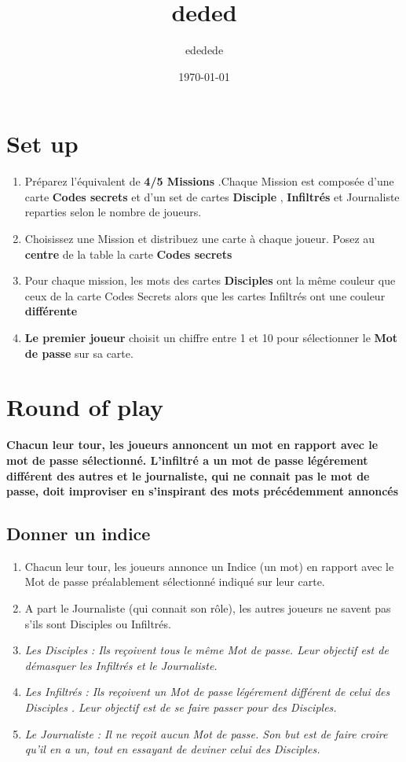 \documentclass{article}%
\title{deded}%
\author{ededede}%
\date{\today}%
\begin{document}
%
\pagestyle{empty}%
\normalsize%
\maketitle%
\section{ Set up
}%
\label{sec:Setup}%
\begin{enumerate}%
\item%
%
 Préparez l'équivalent de %
\textbf{4/5 Missions}%
.Chaque Mission est composée d'une carte %
\textbf{Codes secrets}%
 et d'un set de cartes %
\textbf{Disciple}%
,%
\textbf{ Infiltrés}%
 et Journaliste reparties selon le nombre de joueurs.
%
\item%
%
 Choisissez une Mission et distribuez une carte à chaque joueur. Posez au %
\textbf{centre}%
 de la table la carte %
\textbf{Codes secrets}%
\item%
%
 Pour chaque mission, les mots des cartes %
\textbf{Disciples}%
 ont la même couleur que ceux de la carte Codes Secrets alors que les cartes Infiltrés ont une couleur %
\textbf{différente}%
\item%
%
\textbf{Le premier joueur}%
 choisit un chiffre entre 1 et 10 pour sélectionner le %
\textbf{Mot de passe}%
 sur sa carte.
%
\end{enumerate}

%
\section{ Round of play
}%
\label{sec:Roundofplay}%
\textbf{Chacun leur tour, les joueurs annoncent un mot en rapport avec le mot de passe sélectionné. L'infiltré a un mot de passe légérement différent des autres et le journaliste, qui ne connait pas le mot de passe, doit improviser en s'inspirant des mots précédemment annoncés}

%
\subsection{ Donner un indice
}%
\label{subsec:Donnerunindice}%
\begin{enumerate}%
\item%
%
 Chacun leur tour, les joueurs annonce un Indice (un mot) en rapport avec le Mot de passe préalablement sélectionné indiqué sur leur carte.
%
\item%
%
 A part le Journaliste (qui connait son rôle), les autres joueurs ne savent pas s'ils sont Disciples ou Infiltrés.
%
\item%
%
\textit{Les Disciples}%
\textit{ : Ils reçoivent tous le même Mot de passe. Leur objectif est de démasquer les Infiltrés et le Journaliste.
}%
\item%
%
\textit{Les Infiltrés}%
\textit{ : Ils reçoivent un Mot de passe légérement différent de celui des }%
\textit{Disciples}%
\textit{. Leur objectif est de se faire passer pour des Disciples.
}%
\item%
%
\textit{Le Journaliste}%
\textit{ : Il ne reçoit aucun Mot de passe. Son but est de faire croire qu'il en a un, tout en essayant de deviner celui des Disciples.
}%
\end{enumerate}
\end{document}
